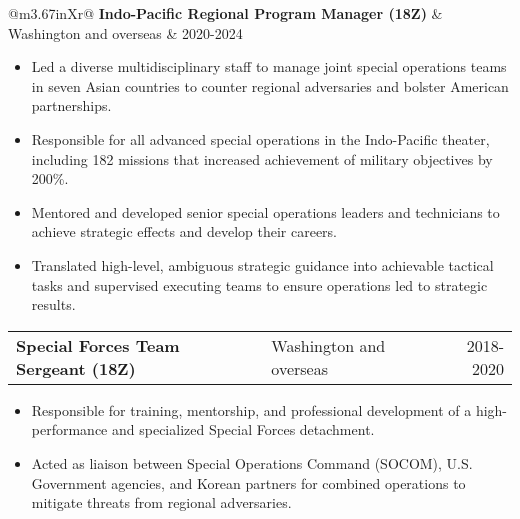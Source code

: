 \documentclass[letterpaper,11pt]{article}
\begin{document}
\begin{leftrule}
  \begin{tabularx}{\linewidth}{@{}m{3.67in}Xr@{}}
    \textbf{Indo-Pacific Regional Program Manager (18Z)} & Washington and overseas & 2020-2024 \\
  \end{tabularx}
  \vspace{-1.75em}
  \begin{itemize}[leftmargin=*,nosep]
    \item Led a diverse multidisciplinary staff to manage joint special operations teams in seven Asian countries to counter regional adversaries and bolster American partnerships.
    \item Responsible for all advanced special operations in the Indo-Pacific theater, including 182 missions that increased achievement of military objectives by 200\%.
    \item Mentored and developed senior special operations leaders and technicians to achieve strategic effects and develop their careers.
    \item Translated high-level, ambiguous strategic guidance into achievable tactical tasks and supervised executing teams to ensure operations led to strategic results.
  \end{itemize}

  \begin{tabularx}{\linewidth}{@{}m{3.67in}Xr@{}}
    \textbf{Special Forces Team Sergeant (18Z)} & Washington and overseas & 2018-2020 \\
  \end{tabularx}
  \vspace{-1.75em}
  \begin{itemize}[leftmargin=*,nosep]
    \item Responsible for training, mentorship, and professional development of a high-performance and specialized Special Forces detachment.
    \item Acted as liaison between Special Operations Command (SOCOM), U.S. Government agencies, and Korean partners for combined operations to mitigate threats from regional adversaries.
  \end{itemize}


\end{leftrule}
\end{document}

